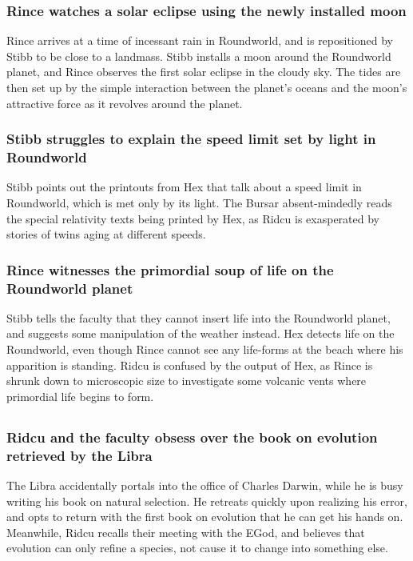 \subsubsection{\Gls{Rince} watches a solar eclipse using the newly installed moon}
\Gls{Rince} arrives at a time of incessant rain in Roundworld, and is repositioned by \Gls{Stibb}
to be close to a landmass. \Gls{Stibb} installs a moon around the Roundworld planet, and \Gls{Rince}
observes the first solar eclipse in the cloudy sky. The tides are then set up by the simple
interaction between the planet's oceans and the moon's attractive force as it revolves around the
planet.

\subsubsection{\Gls{Stibb} struggles to explain the speed limit set by light in Roundworld}
\Gls{Stibb} points out the printouts from \Gls{Hex} that talk about a speed limit in Roundworld,
which is met only by its light. The \Gls{Bursar} absent-mindedly reads the special relativity texts
being printed by \Gls{Hex}, as \Gls{Ridcu} is exasperated by stories of twins aging at different
speeds.

\subsubsection{\Gls{Rince} witnesses the primordial soup of life on the Roundworld planet}
\Gls{Stibb} tells the faculty that they cannot insert life into the Roundworld planet, and suggests
some manipulation of the weather instead. \Gls{Hex} detects life on the Roundworld, even though
\Gls{Rince} cannot see any life-forms at the beach where his apparition is standing. \Gls{Ridcu}
is confused by the output of \Gls{Hex}, as \Gls{Rince} is shrunk down to microscopic size to
investigate some volcanic vents where primordial life begins to form.

\subsection{}
\subsubsection{\Gls{Ridcu} and the faculty obsess over the book on evolution retrieved by the
    \Gls{Libra}}
The \Gls{Libra} accidentally portals into the office of Charles Darwin, while he is busy writing his
book on natural selection. He retreats quickly upon realizing his error, and opts to return with
the first book on evolution that he can get his hands on. Meanwhile, \Gls{Ridcu} recalls their
meeting with the \Gls{EGod}, and believes that evolution can only refine a species, not cause it to
change into something else.

